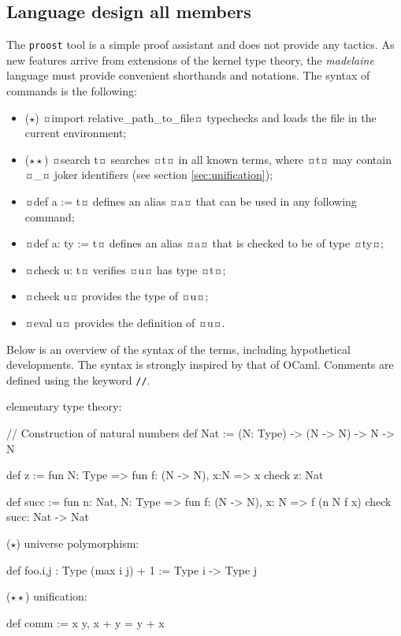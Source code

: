 \documentclass[twocolumn]{article}
\newcommand{\members}[1]{\texorpdfstring{\hfill\scriptsize #1}{}}
\newcommand{\etun}{{\color{Green} ($\star$)} }
\newcommand{\etde}{{\color{Orange} ($\star\star$)} }
\begin{document}
\subsection{Language design \members{all members}} The \texttt{proost} tool is a
simple proof assistant and does not provide any tactics. As new features arrive
from extensions of the kernel type theory, the \emph{madelaine} language must
provide convenient shorthands and notations. The syntax of commands is the
following:
\begin{itemize}
	\item \etun ¤import relative_path_to_file¤ typechecks
		and loads the file in the current environment;
	\item \etde ¤search t¤ searches ¤t¤ in all known terms, where ¤t¤ may contain
		¤_¤ joker identifiers (see section \ref{sec:unification});
	\item ¤def a := t¤
		defines an alias ¤a¤ that can be used in any following command;
	\item ¤def a: ty := t¤ defines an alias ¤a¤ that is checked to
		be of type ¤ty¤;
	\item ¤check u: t¤ verifies ¤u¤ has type ¤t¤;
  \item ¤check u¤ provides the type of ¤u¤;
  \item ¤eval u¤ provides the definition of ¤u¤.
\end{itemize}

Below is an overview of the syntax of the terms, including hypothetical
developments. The syntax is strongly inspired by that of OCaml. Comments are
defined using the keyword \texttt{//}.

\vspace{1.2mm}
elementary type theory:
\begin{proost}
// Construction of natural numbers
def Nat :=
  (N: Type) -> (N -> N) -> N -> N

def z := fun N: Type =>
  fun f: (N -> N), x:N => x
check z: Nat

def succ := fun n: Nat, N: Type =>
  fun f: (N -> N), x: N =>
    f (n N f x)
check succ: Nat -> Nat
\end{proost}

\etun universe polymorphism:
\begin{proost}
def foo.{i,j} : Type (max i j) + 1
:= Type i -> Type j
\end{proost}

\etde unification:
\begin{proost}
def comm := \/x y, x + y = y + x
\end{proost}
\end{document}
